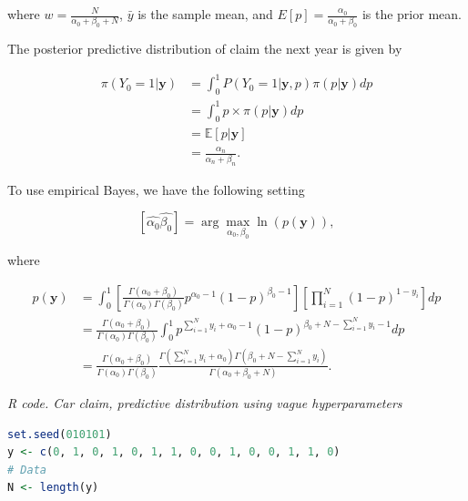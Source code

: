 \begin{enumerate}[leftmargin=*]
	where $w = \frac{N}{\alpha_0 + \beta_0 + N}$, $\bar{y}$ is the sample mean, and $E\left[ p \right]  = \frac{\alpha_0}{\alpha_0 + \beta_0}$ is the prior mean.
	
	The posterior predictive distribution of claim the next year is given by
	
	\begin{align}
		\pi(Y_0 = 1| \textbf{y}) & = \int_{0}^{1}  P(Y_0 = 1| \textbf{y}, p) \pi\left( p | \textbf{y}\right) dp \nonumber \\
		& = \int_{0}^{1}  p  \times \pi\left( p | \textbf{y}\right) dp \nonumber \\
		& =  \mathbb{E}\left[ p | \textbf{y} \right]   \nonumber \\
		& =  \frac{\alpha_n}{\alpha_n + \beta_n}.
	\end{align}
	
	To use empirical Bayes, we have the following setting
	
	\begin{equation*}
		\left[ \hat{\alpha_0} \hat{\beta_0}\right] = \arg \max_{\alpha_0, \beta_0} \ln (p(\textbf{y})), 
	\end{equation*}

where
	
	\begin{align}
		p(\textbf{y}) & = \int_{0}^{1} \left[ \frac{\Gamma\left( \alpha_0 + \beta_0\right) }{\Gamma\left( \alpha_0\right) \Gamma\left( \beta_0\right) } p^{\alpha_0 - 1} \left( 1 - p\right)^{\beta_0 - 1} \right]  \left[ \prod_{i = 1}^{N}  \left( 1 - p\right)^{1 - y_i}  \right] dp \\
		& =  \frac{\Gamma\left( \alpha_0 + \beta_0\right) }{\Gamma\left( \alpha_0\right) \Gamma\left( \beta_0\right) }  \int_{0}^{1} p^{\sum_{i = 1}^{N} y_i + \alpha_0 - 1} \left( 1 - p \right)^{\beta_0 + N - \sum_{i = 1}^{N} y_i -1} dp \nonumber \\
		& =  \frac{\Gamma\left( \alpha_0 + \beta_0\right) }{\Gamma\left( \alpha_0\right) \Gamma\left( \beta_0\right)} \frac{\Gamma\left(\sum_{i = 1}^{N} y_i + \alpha_0 \right) \Gamma\left(\beta_0 + N - \sum_{i = 1}^{N} y_i \right) }{\Gamma\left( \alpha_0 + \beta_0 + N\right) }.\nonumber 
	\end{align}

\begin{tcolorbox}[enhanced,width=4.67in,center upper,
	fontupper=\large\bfseries,drop shadow southwest,sharp corners]
	\textit{R code. Car claim, predictive distribution using vague hyperparameters}
\begin{VF}
\begin{lstlisting}[basicstyle=\footnotesize, language=R]
set.seed(010101)
y <- c(0, 1, 0, 1, 0, 1, 1, 0, 0, 1, 0, 0, 1, 1, 0) 
# Data
N <- length(y)


\end{lstlisting}
\end{VF}
\end{tcolorbox}
\end{enumerate}
